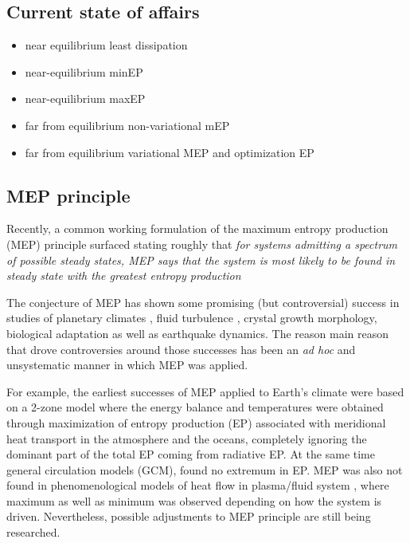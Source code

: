 \documentclass[a4paper,12pt]{article}
\begin{document}
\subsection{Current state of affairs}
\begin{itemize}
	\item near equilibrium least dissipation
	\item near-equilibrium minEP
	\item near-equilibrium maxEP
	\item far from equilibrium non-variational mEP
	\item far from equilibrium variational MEP and optimization EP
\end{itemize}


\subsection{MEP principle}

Recently, a common working formulation of the maximum entropy production (MEP) principle surfaced stating roughly that \textit{for systems admitting a spectrum of possible steady states, MEP says that the system is most likely to be found in steady state  with the greatest entropy production}

The conjecture of MEP has shown some promising (but controversial) success in studies of planetary climates \cite{Paltridge:2007jf}, fluid turbulence \cite{Ozawa:2003jt} \cite{MALKUS:2003ix}, crystal growth morphology, biological adaptation as well as earthquake dynamics. %
The reason main reason that drove controversies around those successes has been an \textit{ad hoc} and unsystematic manner in which MEP was applied.

For example, the earliest successes of MEP applied to Earth's climate were based on a 2-zone model where the energy balance and temperatures were obtained through maximization of entropy production (EP) associated with meridional heat transport in the atmosphere and the oceans, completely ignoring the dominant part of the total EP coming from radiative EP. At the same time general circulation models (GCM), found no extremum in EP. MEP was also not found in phenomenological models of heat flow in plasma/fluid system \cite{Kawazura:2010dy}, where maximum as well as minimum was observed depending on how the system is driven. Nevertheless, possible adjustments to MEP principle are still being researched.
\end{document}
